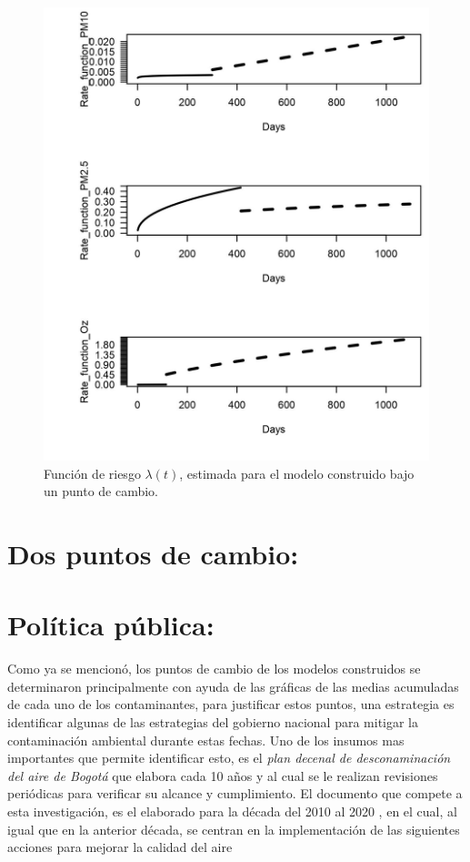 \begin{figure}[hbt!]
\begin{center}
\includegraphics[width=13cm]{Rate_function_upc}
\end{center}
\centering
\caption{ Función de riesgo $\lambda (t)$, estimada para el modelo construido bajo un punto de cambio.   }
\label{rate_upc}
\end{figure}


\section{Dos puntos de cambio:}

\section{Política pública:}

Como ya se mencionó, los puntos de cambio de los modelos construidos se determinaron principalmente con ayuda de las gráficas de las medias acumuladas de cada uno de los contaminantes, para justificar estos puntos, una estrategia es identificar algunas de las estrategias del gobierno nacional para mitigar la contaminación ambiental durante estas fechas.
Uno de los insumos mas importantes que permite identificar esto, es el \textit{plan decenal de desconaminación del aire de Bogotá} que elabora cada 10 años y al cual se le realizan revisiones periódicas para verificar su alcance y cumplimiento. 
El documento que compete a esta investigación, es el elaborado para la década del 2010 al 2020 \cite{plandecenal}, en el cual, al igual que en la anterior década, se centran en la implementación de las siguientes acciones para mejorar la calidad del aire 

